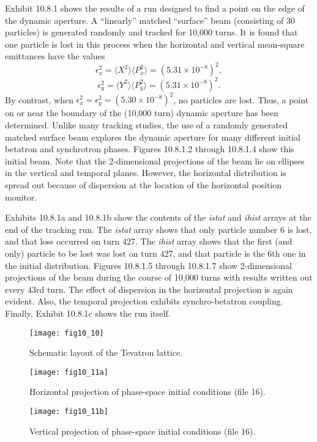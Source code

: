 Exhibit 10.8.1 shows the results of a \Mary run designed to find a point
on the edge of the dynamic aperture.  A ``linearly'' matched ``surface''
beam (consisting of 30 particles) is generated randomly and tracked for
10,000 turns.  It is found that one particle is lost in this process when
the horizontal and vertical mean-square emittances have the values
\[
\epsilon^2_x = \langle X^2\rangle \langle P^2_x\rangle = (5.31 \times
10^{-8})^2,
\]
\[
\epsilon^2_y = \langle Y^2\rangle \langle P^2_y\rangle = (5.31 \times
10^{-8})^2.
\]
By contrast, when $\epsilon^2_x = \epsilon^2_y = (5.30 \times
10^{-8})^2$, no particles are lost.  Thus, a point on or near the
boundary of the (10,000 turn) dynamic aperture has been determined.
Unlike many tracking studies, the use of a randomly generated matched
surface beam explores the dynamic aperture for many different initial
betatron and synchrotron phases.  Figures 10.8.1.2 through 10.8.1.4 show this
initial beam.  Note that the 2-dimensional projections of the beam lie
on ellipses in the vertical and temporal planes.  However, the horizontal
distribution is spread out because of dispersion at the location of the
horizontal position monitor.

Exhibits 10.8.1a and 10.8.1b show the contents of the {\em istat} and
{\em ihist} arrays at the end of the tracking run.  The {\em istat} array
shows that only particle number 6 is lost, and that loss occurred on turn
427.  The {\em ihist} array shows that the first (and only) particle to
be lost was lost on turn 427, and that particle is the 6th one in the
initial distribution.  Figures 10.8.1.5 through 10.8.1.7 show 2-dimensional
projections of the beam during the course of 10,000 turns with results
written out every 43rd turn.  The effect of dispersion in the horizontal
projection is again evident.  Also, the temporal projection exhibits
synchro-betatron coupling.  Finally, Exhibit 10.8.1c shows the \Mary
run itself.

\newpage
\begin{figure}[htbp]
  \centering
  \texttt{[image: fig10\_10]}
  \caption{Schematic layout of the Tevatron lattice.}
\end{figure}

\newpage
\begin{figure}[htbp]
  \centering
  \texttt{[image: fig10\_11a]}
  \caption{Horizontal projection of phase-space initial conditions (file 16).}
\end{figure}

\newpage
\begin{figure}[htbp]
  \centering
  \texttt{[image: fig10\_11b]}
  \caption{Vertical projection of phase-space initial conditions (file 16).}
\end{figure}

